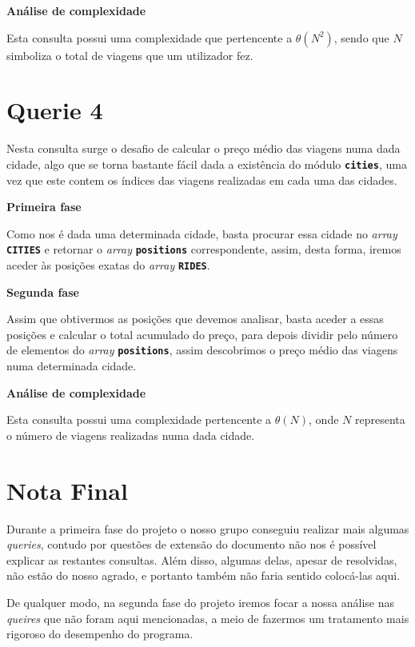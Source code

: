 \documentclass[12pt,a4paper]{report}
\begin{document}
\normalsize\textbf{Análise de complexidade }{\titlerule[0.5pt]}

Esta consulta possui uma complexidade que pertencente a \(\theta(N^2)\), sendo que \(N\) simboliza o total de viagens que um utilizador fez. 


\section{Querie 4}

Nesta consulta surge o desafio de calcular o preço médio das viagens numa dada cidade, algo que se torna bastante fácil dada a existência do módulo \textbf{\small\texttt{cities}}, uma vez que este contem os índices das viagens realizadas em cada uma das cidades.

\normalsize\textbf{Primeira fase }{\titlerule[0.5pt]}

Como nos é dada uma determinada cidade, basta procurar essa cidade no \textit{array} \textbf{\small\texttt{CITIES}} e retornar o \textit{array} \textbf{\small\texttt{positions}} correspondente, assim, desta forma, iremos aceder às posições exatas do \textit{array} \textbf{\small\texttt{RIDES}}.

\normalsize\textbf{Segunda fase }{\titlerule[0.5pt]}

Assim que obtivermos as posições que devemos analisar, basta aceder a essas posições e calcular o total acumulado do preço, para depois dividir pelo número de elementos do \textit{array} \textbf{\small\texttt{positions}}, assim descobrimos o preço médio das viagens numa determinada cidade.

\normalsize\textbf{Análise de complexidade }{\titlerule[0.5pt]}

Esta consulta possui uma complexidade pertencente a \(\theta(N)\), onde \(N\) representa o número de viagens realizadas numa dada cidade.

\section{Nota Final}

Durante a primeira fase do projeto o nosso grupo conseguiu realizar mais algumas \textit{queries}, contudo por questões de extensão do documento não nos é possível explicar as restantes consultas. Além disso, algumas delas, apesar de resolvidas, não estão do nosso agrado, e portanto também não faria sentido colocá-las aqui.

De qualquer modo, na segunda fase do projeto iremos focar a nossa análise nas \textit{queires} que não foram aqui mencionadas, a meio de fazermos um tratamento mais rigoroso do desempenho do programa. 
\end{document}

